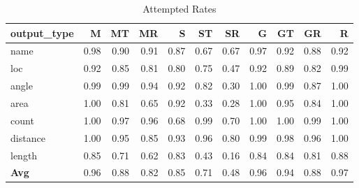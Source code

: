\begin{table}
\caption{Attempted Rates}
\label{tab:attempted_rates}
\begin{tabular}{lrrrrrrrrrr}
\hline
output\_type & M & MT & MR & S & ST & SR & G & GT & GR & R \\
\hline
name & 0.98 & 0.90 & 0.91 & 0.87 & 0.67 & 0.67 & 0.97 & 0.92 & 0.88 & 0.92 \\
loc & 0.92 & 0.85 & 0.81 & 0.80 & 0.75 & 0.47 & 0.92 & 0.89 & 0.82 & 0.99 \\
angle & 0.99 & 0.99 & 0.94 & 0.92 & 0.82 & 0.30 & 1.00 & 0.99 & 0.87 & 1.00 \\
area & 1.00 & 0.81 & 0.65 & 0.92 & 0.33 & 0.28 & 1.00 & 0.95 & 0.84 & 1.00 \\
count & 1.00 & 0.97 & 0.96 & 0.68 & 0.99 & 0.70 & 1.00 & 1.00 & 0.99 & 1.00 \\
distance & 1.00 & 0.95 & 0.85 & 0.93 & 0.96 & 0.80 & 0.99 & 0.98 & 0.96 & 1.00 \\
length & 0.85 & 0.71 & 0.62 & 0.83 & 0.43 & 0.16 & 0.84 & 0.84 & 0.81 & 0.88 \\
\hline
\textbf{Avg} & 0.96 & 0.88 & 0.82 & 0.85 & 0.71 & 0.48 & 0.96 & 0.94 & 0.88 & 0.97 \\
\hline
\end{tabular}
\end{table}
